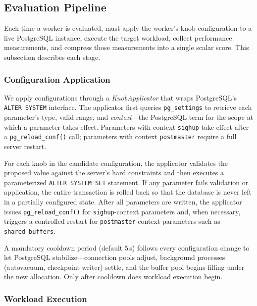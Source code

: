 \subsection{Evaluation Pipeline}
\label{ssec:evaluation}

Each time a worker is evaluated, \sysname must apply the worker's knob
configuration to a live PostgreSQL instance, execute the target workload,
collect performance measurements, and compress those measurements into a
single scalar score.  This subsection describes each stage.

\subsubsection{Configuration Application}
\label{sssec:config-apply}

We apply configurations through a \emph{KnobApplicator} that wraps
PostgreSQL's \texttt{ALTER SYSTEM} interface.  The applicator first queries
\texttt{pg\_settings} to retrieve each parameter's type, valid range, and
\emph{context}---the PostgreSQL term for the scope at which a parameter takes
effect.  Parameters with context \texttt{sighup} take effect after a
\texttt{pg\_reload\_conf()} call; parameters with context
\texttt{postmaster} require a full server restart.

For each knob in the candidate configuration, the applicator validates the
proposed value against the server's hard constraints and then executes a
parameterized \texttt{ALTER SYSTEM SET} statement.  If any parameter fails
validation or application, the entire transaction is rolled back so that the
database is never left in a partially configured state.  After all parameters
are written, the applicator issues \texttt{pg\_reload\_conf()} for
\texttt{sighup}-context parameters and, when necessary, triggers a controlled
restart for \texttt{postmaster}-context parameters such as
\texttt{shared\_buffers}.

A mandatory cooldown period (default 5\,s) follows every configuration change
to let PostgreSQL stabilize---connection pools adjust, background processes
(autovacuum, checkpoint writer) settle, and the buffer pool begins filling
under the new allocation.  Only after cooldown does workload execution begin.

\subsubsection{Workload Execution}
\label{sssec:workload-exec}

